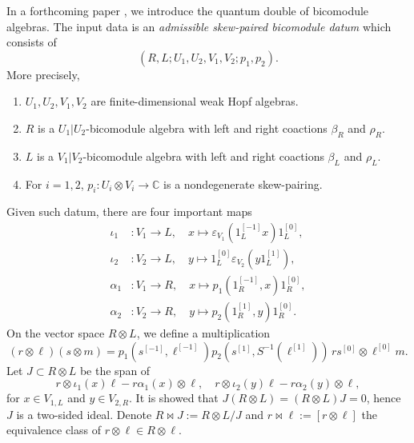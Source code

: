 \documentclass[a4paper,11pt]{article}
\theoremstyle{definition}
\theoremstyle{remark}
\begin{document}
In a forthcoming paper \cite{jia2026double}, we introduce the quantum double of bicomodule algebras. The input data is an \emph{admissible skew-paired bicomodule datum} which consists of
\[
 (R, L;U_1, U_2, V_1, V_2;p_1, p_2). 
\]
More precisely,
\begin{enumerate}
\item
\(U_1, U_2, V_1, V_2\) are finite-dimensional weak Hopf algebras.
\item
\(R\) is a \(U_1|U_2\)-bicomodule algebra with left and right coactions $\beta_R$ and $\rho_R$.  
\item
\(L\) is a \(V_1|V_2\)-bicomodule algebra with left and right coactions $\beta_L$ and $\rho_L$.  
\item
For \(i=1, 2\),  \(p_i\colon U_i\otimes V_i\to \mathbb{C}\) is a nondegenerate skew-pairing.  
\end{enumerate}
Given such datum, there are four important maps 
\begin{align}
    \iota_1&:V_1\to L, \quad x\mapsto \varepsilon_{V_1}(1_L^{[-1]}x)1_L^{[0]},  \\
    \iota_2&:V_2\to L,  \quad  y\mapsto 1_L^{[0]}\varepsilon_{V_2}(y1_L^{[1]}), \\
    \alpha_1&: V_1\to R,  \quad x\mapsto p_1(1_R^{[-1]}, x)1_R^{[0]} , \\
    \alpha_2&: V_2\to R,  \quad y\mapsto p_2(1_R^{[1]}, y)1_R^{[0]}. 
\end{align}
On the vector space $R\otimes L$, we define a multiplication 
\begin{equation} \label{eq:multiplication-QD}
    (r\otimes\ell)(s\otimes m) = p_1(s^{[-1]}, \ell^{[-1]}) p_2(s^{[1]}, S^{-1}(\ell^{[1]}))\,  rs^{[0]}\otimes\ell^{[0]}m.
\end{equation}
Let \(J\subset R\otimes L\) be the span of
\begin{equation}
 r\otimes\iota_1(x)\ell-r\alpha_1(x)\otimes\ell,  \quad r\otimes\iota_2(y)\ell-r\alpha_2(y)\otimes\ell, 
\end{equation}
for $x\in V_{1, L}$ and $y\in V_{2, R}$. It is showed that $J(R\otimes L) = (R\otimes L) J=0$, hence $J$ is a two-sided ideal. Denote $R\Join J:=R\otimes L/J$ and $r\Join\ell:=[r\otimes \ell]$ the equivalence class of $r\otimes \ell\in R\otimes \ell$. 
\end{document}

